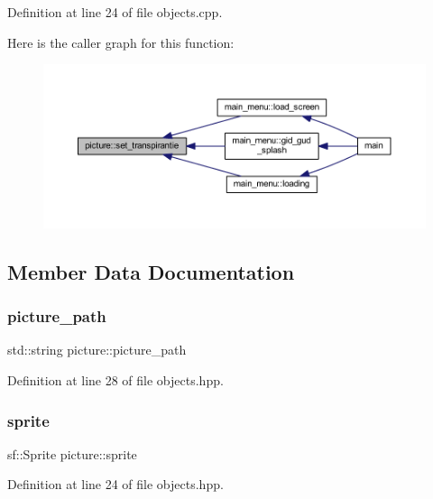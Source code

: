 Definition at line 24 of file objects.\+cpp.

Here is the caller graph for this function\+:
\nopagebreak
\begin{figure}[H]
\begin{center}
\leavevmode
\includegraphics[width=350pt]{classpicture_a4222d8d8a5be3d0775b741049064714f_icgraph}
\end{center}
\end{figure}


\subsection{Member Data Documentation}
\mbox{\label{classpicture_ab294409095c573549bdc79f9e6d31024}} 
\subsubsection{\texorpdfstring{picture\+\_\+path}{picture\_path}}
{\footnotesize\ttfamily std\+::string picture\+::picture\+\_\+path}



Definition at line 28 of file objects.\+hpp.

\mbox{\label{classpicture_abbfcd0b2bcba33144c7e3f34a19f7071}} 
\subsubsection{\texorpdfstring{sprite}{sprite}}
{\footnotesize\ttfamily sf\+::\+Sprite picture\+::sprite\hspace{0.3cm}{\ttfamily [private]}}



Definition at line 24 of file objects.\+hpp.


